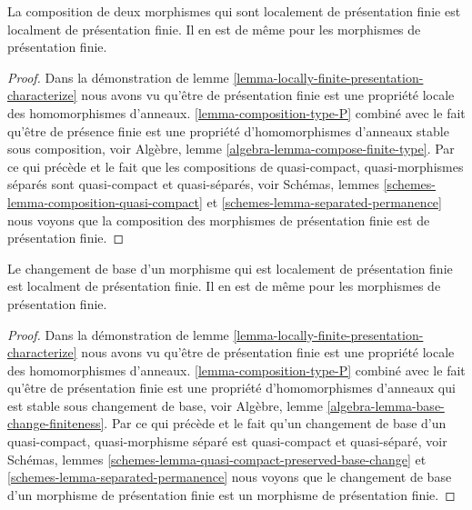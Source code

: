 \begin{lemma}

\label{lemma-composition-finite-presentation}

La composition de deux morphismes qui sont localement de présentation finie est localment de présentation finie. Il en est de même pour les morphismes de présentation finie.

\end{lemma}

\begin{proof}

Dans la démonstration de lemme \ref{lemma-locally-finite-presentation-characterize}
nous avons vu qu'être de présentation finie est une propriété locale des homomorphismes d'anneaux. \ref{lemma-composition-type-P} combiné avec le fait qu'être de présence finie est une propriété d'homomorphismes d'anneaux stable sous composition, voir Algèbre, lemme \ref{algebra-lemma-compose-finite-type}. Par ce qui précède et le fait que les compositions de quasi-compact, quasi-morphismes séparés sont quasi-compact et quasi-séparés, voir Schémas, lemmes \ref{schemes-lemma-composition-quasi-compact}
et \ref{schemes-lemma-separated-permanence}
nous voyons que la composition des morphismes de présentation finie est de présentation finie.

\end{proof}

\begin{lemma}

\label{lemma-base-change-finite-presentation}

Le changement de base d'un morphisme qui est localement de présentation finie est localment de présentation finie. Il en est de même pour les morphismes de présentation finie.

\end{lemma}

\begin{proof}

Dans la démonstration de lemme \ref{lemma-locally-finite-presentation-characterize}
nous avons vu qu'être de présentation finie est une propriété locale des homomorphismes d'anneaux. \ref{lemma-composition-type-P} combiné avec le fait qu'être de présentation finie est une propriété d'homomorphismes d'anneaux qui est stable sous changement de base, voir Algèbre, lemme \ref{algebra-lemma-base-change-finiteness}. Par ce qui précède et le fait qu'un changement de base d'un quasi-compact, quasi-morphisme séparé est quasi-compact et quasi-séparé, voir Schémas, lemmes \ref{schemes-lemma-quasi-compact-preserved-base-change}
et \ref{schemes-lemma-separated-permanence}
nous voyons que le changement de base d'un morphisme de présentation finie est un morphisme de présentation finie.

\end{proof}

